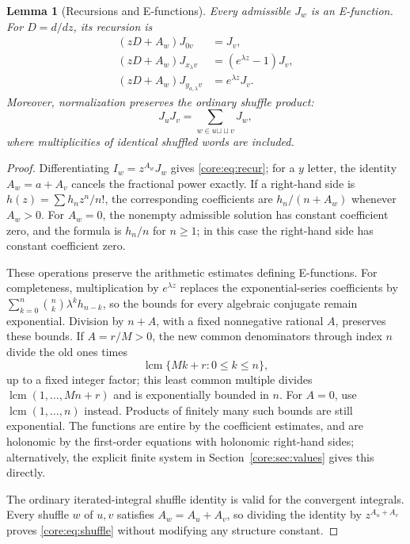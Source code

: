 \documentclass[11pt,a4paper]{article}
\newcommand{\sh}{\mathbin{\sqcup\!\sqcup}}
\newtheorem{lemma}[theorem]{Lemma}
\theoremstyle{definition}
\theoremstyle{remark}
\numberwithin{equation}{section}
\begin{document}
\begin{lemma}[Recursions and E-functions]\label{core:lem:E}
Every admissible $J_w$ is an E-function. For $D=d/dz$, its recursion is
\begin{align}
 (zD+A_w)J_{0v}&=J_v,\\
 (zD+A_w)J_{x_\lambda v}&=(e^{\lambda z}-1)J_v,\\
 (zD+A_w)J_{y_{a,\lambda}v}&=e^{\lambda z}J_v.
 \label{core:eq:recur}
\end{align}
Moreover, normalization preserves the ordinary shuffle product:
\begin{equation}
 J_uJ_v=\sum_{w\in u\sh v}J_w,
 \label{core:eq:shuffle}
\end{equation}
where multiplicities of identical shuffled words are included.
\end{lemma}
\begin{proof}
Differentiating $I_w=z^{A_w}J_w$ gives \eqref{core:eq:recur}; for a $y$ letter,
the identity $A_w=a+A_v$ cancels the fractional power exactly.
If a right-hand side is $h(z)=\sum h_nz^n/n!$, the corresponding
coefficients are $h_n/(n+A_w)$ whenever $A_w>0$. For $A_w=0$, the
nonempty admissible solution has constant coefficient zero, and the
formula is $h_n/n$ for $n\ge1$; in this case the right-hand side has
constant coefficient zero.

These operations preserve the arithmetic estimates defining E-functions.
For completeness, multiplication by $e^{\lambda z}$ replaces the
exponential-series coefficients by
$\sum_{k=0}^n\binom nk\lambda^kh_{n-k}$, so the bounds for every
algebraic conjugate remain exponential. Division by $n+A$, with a fixed
nonnegative rational $A$, preserves these bounds. If $A=r/M>0$, the
new common denominators through index $n$ divide the old ones times
\[
 \operatorname{lcm}\{Mk+r:0\le k\le n\},
\]
up to a fixed integer factor; this least common multiple divides
$\operatorname{lcm}(1,\ldots,Mn+r)$ and is exponentially bounded in $n$.
For $A=0$, use $\operatorname{lcm}(1,\ldots,n)$ instead. Products of
finitely many such bounds are still exponential. The functions are
entire by the coefficient estimates, and are holonomic by the
first-order equations with holonomic right-hand sides; alternatively,
the explicit finite system in Section~\ref{core:sec:values} gives this directly.

The ordinary iterated-integral shuffle identity is valid for the
convergent integrals. Every shuffle $w$ of $u,v$ satisfies
$A_w=A_u+A_v$, so dividing the identity by $z^{A_u+A_v}$ proves
\eqref{core:eq:shuffle} without modifying any structure constant.
\end{proof}
\end{document}
